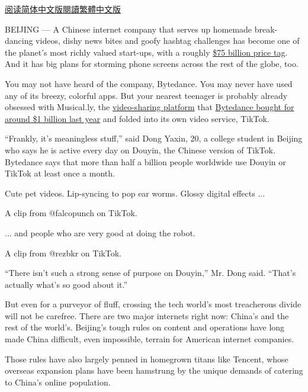\href{https://cn.nytimes3xbfgragh.onion/technology/20181030/bytedance-app-funding-china/}{阅读简体中文版}\href{https://cn.nytimes3xbfgragh.onion/technology/20181030/bytedance-app-funding-china/zh-hant/}{閱讀繁體中文版}

BEIJING --- A Chinese internet company that serves up homemade
break-dancing videos, dishy news bites and goofy hashtag challenges has
become one of the planet's most richly valued start-ups, with a roughly
\href{https://www.nytimes3xbfgragh.onion/2018/09/28/technology/bytedance-fundraising-toutiao-tiktok.html}{\$75
billion price tag}. And it has big plans for storming phone screens
across the rest of the globe, too.

You may not have heard of the company, Bytedance. You may never have
used any of its breezy, colorful apps. But your nearest teenager is
probably already obsessed with Musical.ly, the
\href{https://www.nytimes3xbfgragh.onion/2016/08/10/technology/china-homegrown-internet-companies-rest-of-the-world.html}{video-sharing
platform} that
\href{https://www.nytimes3xbfgragh.onion/2017/11/10/business/dealbook/musically-sold-app-video.html}{Bytedance
bought for around \$1 billion last year} and folded into its own video
service, TikTok.

``Frankly, it's meaningless stuff,'' said Dong Yaxin, 20, a college
student in Beijing who says he is active every day on Douyin, the
Chinese version of TikTok. Bytedance says that more than half a billion
people worldwide use Douyin or TikTok at least once a month.

Cute pet videos. Lip-syncing to pop ear worms. Glossy digital effects
...

A clip from @falcopunch on TikTok.

... and people who are very good at doing the robot.

A clip from @rezbkr on TikTok.

``There isn't such a strong sense of purpose on Douyin,'' Mr. Dong said.
``That's actually what's so good about it.''

But even for a purveyor of fluff, crossing the tech world's most
treacherous divide will not be carefree. There are two major internets
right now: China's and the rest of the world's. Beijing's tough rules on
content and operations have long made China difficult, even impossible,
terrain for American internet companies.

Those rules have also largely penned in homegrown titans like Tencent,
whose overseas expansion plans have been hamstrung by the unique demands
of catering to China's online population.

